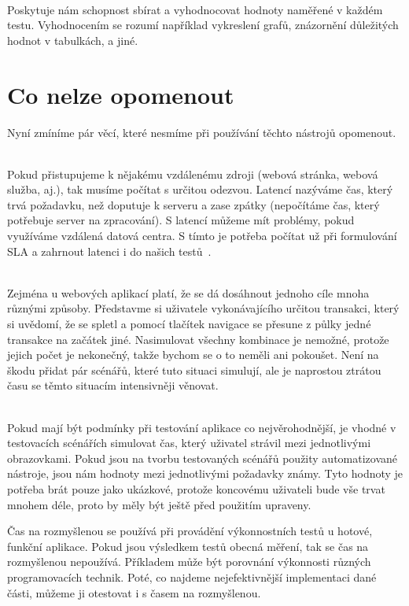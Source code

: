 \documentclass[122pt,oneside]{fithesis}
\begin{document}
\vspace{5 mm}
\\\indent Poskytuje nám schopnost sbírat a vyhodnocovat hodnoty naměřené v každém testu. Vyhodnocením se rozumí například vykreslení grafů, znázornění důležitých hodnot v tabulkách, a jiné.

\section{Co nelze opomenout}
Nyní zmíníme pár věcí, které nesmíme při používání těchto nástrojů opomenout.

\vspace{5 mm}
\\\indent Pokud přistupujeme k nějakému vzdálenému zdroji (webová stránka, webová služba, aj.), tak musíme počítat s určitou odezvou. Latencí nazýváme čas, který trvá požadavku, než doputuje k serveru a zase zpátky (nepočítáme čas, který potřebuje server na zpracování). S latencí můžeme mít problémy, pokud využíváme vzdálená datová centra. S tímto je potřeba počítat už při formulování SLA a zahrnout latenci i do našich testů~\cite{bhatt09}.

\vspace{5 mm}
\\\indent Zejména u webových aplikací platí, že se dá dosáhnout jednoho cíle mnoha různými způsoby. Představme si uživatele vykonávajícího určitou transakci, který si uvědomí, že se spletl a pomocí tlačítek navigace se přesune z půlky jedné transakce na začátek jiné. Nasimulovat všechny kombinace je nemožné, protože jejich počet je nekonečný, takže bychom se o to neměli ani pokoušet. Není na škodu přidat pár scénářů, které tuto situaci simulují, ale je naprostou ztrátou času se těmto situacím intensivněji věnovat.

\vspace{5 mm}
\\\indent Pokud mají být podmínky při testování aplikace co nejvěrohodnější, je vhodné v testovacích scénářích simulovat čas, který uživatel strávil mezi jednotlivými obrazovkami. Pokud jsou na tvorbu testovaných scénářů použity automatizované nástroje, jsou nám hodnoty mezi jednotlivými požadavky známy. Tyto hodnoty je potřeba brát pouze jako ukázkové, protože koncovému uživateli bude vše trvat mnohem déle, proto by měly být ještě před použitím upraveny.

Čas na rozmyšlenou se používá při provádění výkonnostních testů u hotové, funkční aplikace. Pokud jsou výsledkem testů obecná měření, tak se čas na rozmyšlenou nepoužívá. Příkladem může být porovnání výkonnosti různých programovacích technik. Poté, co najdeme nejefektivnější implementaci dané části, můžeme ji otestovat i s časem na rozmyšlenou.
\end{document}
